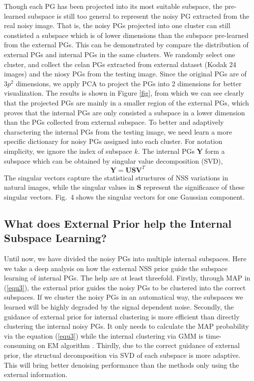 \documentclass[10pt,twocolumn,letterpaper]{article}
\begin{document}
Though each PG has been projected into its most suitable subspace, the pre-learned subspace is still too general to represent the noisy PG extracted from the real noisy image. That is, the noisy PGs projected into one cluster can still constisted a subspace which is of lower dimensions than the subspace pre-learned from the external PGs. This can be demonstrated by compare the distribution of external PGs and internal PGs in the same clusters. We randomly select one cluster, and collect the celan PGs extracted from external dataset (Kodak 24 images) and the niosy PGs from the testing image. Since the original PGs are of $3p^{2}$ dimensions, we apply PCA to project the PGs into 2 dimensions for better visualization. The results is shown in Figure \ref{fig}, from which we can see clearly that the projected PGs are mainly in a smaller region of the external PGs, which proves that the internal PGs are only consisted a subspace in a lower dimension than the PGs collected from external subspace. To better and adaptively charactering the internal PGs from the testing image, we need learn a more specific dictionary for noisy PGs assigned into each cluster. For notation simplicity, we ignore the index of subspace $k$. The internal PGs $\mathbf{Y}$ form a subspace which can be obtained by singular value decomposition (SVD),
\begin{equation}\label{equ4}
\mathbf{Y}=\mathbf{U}\mathbf{S}\mathbf{V}^{T}
\end{equation}
The singular vectors capture the statistical structures of NSS variations in natural images, while the singular values in $\mathbf{S}$ represent the significance of these singular vectors. Fig.\ 4 shows the singular vectors for one Gaussian component.

\subsection{What does External Prior help the Internal Subspace Learning?}
Until now, we have divided the noisy PGs into multiple internal subspaces. Here we take a deep analysis on how the external NSS prior guide the subspace learning of internal PGs. The help are at least threefold. Firstly, through MAP in (\ref{equ3}), the external prior guides the noisy PGs to be clustered into the correct subspaces. If we cluster the noisy PGs in an automatical way, the subspaces we learned will be highly degraded by the signal dependent noise. Secondly, the guidance of external prior for internal clustering is more efficient than directly clustering the internal noisy PGs. It only needs to calculate the MAP probability via the equation (\ref{equ3}) while the internal clustering via GMM is time-consuming on EM algorithm \cite{em}. Thirdly, due to the correct guidance of external prior, the structual decomposition via SVD of each subspace is more adaptive. This will bring better denoising performance than the methods only using the external information.
\end{document}
